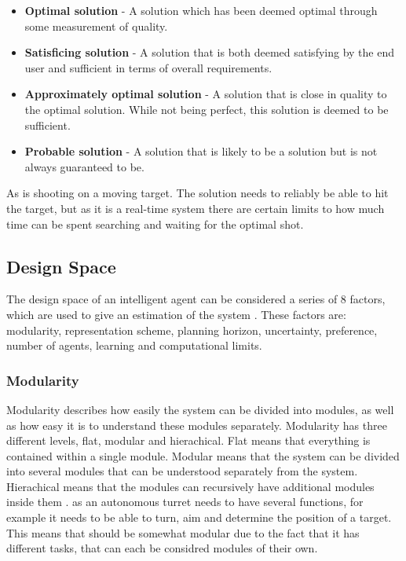 \begin{itemize}
  \item \textbf{Optimal solution} - A solution which has been deemed optimal
  through some measurement of quality.
  \item \textbf{Satisficing solution} - A solution that is both deemed
  satisfying by the end user and sufficient in terms of overall requirements. 
  \item \textbf{Approximately optimal solution} - A solution that is close in
  quality to the optimal solution. While not being perfect, this solution is
  deemed to be sufficient.
  \item \textbf{Probable solution} - A solution that is likely to be a solution
  but is not always guaranteed to be.
\end{itemize}

As \name is shooting on a moving target. The solution needs to reliably be able
to hit the target, but as it is a real-time system there are certain limits to
how much time can be spent searching and waiting for the optimal shot.

\subsection{Design Space}
The design space of an intelligent agent can be considered a series of 8
factors, which are used to give an estimation of the system \citep[Ch.
1.5]{MIBook}. These factors are: modularity, representation scheme, planning
horizon, uncertainty, preference, number of agents, learning and computational
limits.

\subsubsection{Modularity}
Modularity describes how easily the system can be divided into modules, as well
as how easy it is to understand these modules separately. Modularity has three
different levels, flat, modular and hierachical. Flat means that everything is
contained within a single module. Modular means that the system can be divided
into several modules that can be understood separately from the system.
Hierachical means that the modules can recursively have additional modules
inside them \citep[Ch 1.5.1]{MIBook}. \name as an autonomous turret needs to
have several functions, for example it needs to be able to turn, aim and determine the position of a target.
This means that \name should be somewhat modular due to the fact that it has
different tasks, that can each be considred modules of their own.

